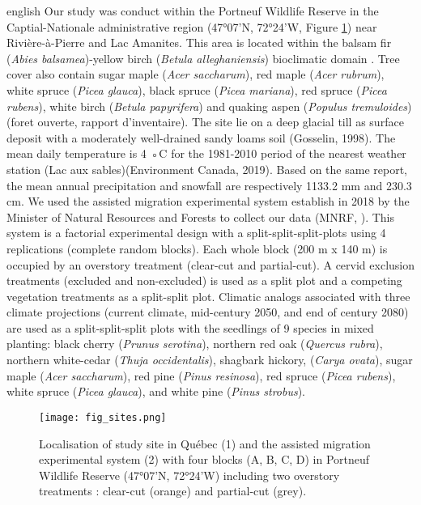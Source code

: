 \begin{otherlanguage*}{english}
  Our study was conduct within the Portneuf Wildlife Reserve in the Captial-Nationale administrative region (47°07'N, 72°24'W, Figure \ref{fig:sites}) near Rivière-à-Pierre and Lac Amanites. 
  This area is located within the balsam fir (\textit{Abies balsamea})-yellow birch (\textit{Betula alleghaniensis}) bioclimatic domain \citep{saucierChapitreEcologieForestiere2009}.
  Tree cover also contain sugar maple (\textit{Acer saccharum}), red maple (\textit{Acer rubrum}), white spruce (\textit{Picea glauca}), black spruce (\textit{Picea mariana}), red spruce (\textit{Picea rubens}),
  white birch (\textit{Betula papyrifera}) and quaking aspen (\textit{Populus tremuloides}) (foret ouverte, rapport d'inventaire). 
  The site lie on a deep glacial till as surface deposit with a moderately well-drained sandy loams soil (Gosselin, 1998).
  The mean daily temperature is 4 ◦C for the 1981-2010 period of the nearest weather station (Lac aux sables)(Environment Canada, 2019). 
  Based on the same report, the mean annual precipitation and snowfall are respectively 1133.2 mm and 230.3 cm.
  We used the assisted migration experimental system establish in 2018 by the Minister of Natural Resources and Forests to collect our data (MNRF, \citealp{royoDesiredREgenerationAssisted2023}).
  This system is a factorial experimental design with a split-split-split-plots using 4 replications (complete random blocks). 
  Each whole block (200 m x 140 m) is occupied by an overstory treatment (clear-cut and partial-cut). 
  A cervid exclusion treatments (excluded and non-excluded) is used as a split plot and a competing vegetation treatments as a split-split plot. 
  Climatic analogs associated with three climate projections (current climate, mid-century 2050, and end of century 2080) 
  are used as a split-split-split plots with the seedlings of 9 species in mixed planting: black cherry (\textit{Prunus serotina}), northern red oak (\textit{Quercus rubra}), 
  northern white-cedar (\textit{Thuja occidentalis}), shagbark hickory, (\textit{Carya ovata}), sugar maple (\textit{Acer saccharum}), red pine (\textit{Pinus resinosa}), 
  red spruce (\textit{Picea rubens}), white spruce (\textit{Picea glauca}), and white pine (\textit{Pinus strobus}).

\end{otherlanguage*}

\begin{figure}[ht!]
	\centering
	\texttt{[image: fig\_sites.png]}
	\caption[Localisation of study site in Québec, Canada.]{Localisation of study site in Québec (1) and the assisted migration experimental system (2) with four blocks (A, B, C, D) in Portneuf Wildlife Reserve (47°07'N, 72°24'W) including two overstory treatments : clear-cut (orange) and partial-cut (grey).}
	\label{fig:sites}
	\end{figure}  



